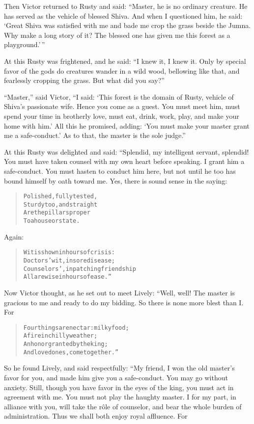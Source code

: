 \documentclass[article, twoside, 14pt]{memoir}
\renewenvironment{verbatim}{%
\begin{quote}%
\vskip -10pt%
\begin{alltt}\normalfont\large}{\end{alltt}%
\end{quote}%
\vskip -10pt
} %
\begin{document}
Then Victor returned to Rusty and said:
``Master, he is no ordinary creature. He has served as the vehicle of blessed Shiva. And when I questioned him, he said: `Great Shiva was satisfied with me and bade me crop the grass beside the Jumna. Why make a long story of it? The blessed one has given me this forest as a playground.'\,''

At this Rusty was frightened, and he said:
``I knew it, I knew it. Only by special favor of the gods do creatures wander in a wild wood, bellowing like that, and fearlessly cropping the grass. But what did you say?''

``Master,'' said Victor,
``I said: `This forest is the domain of Rusty, vehicle of Shiva's passionate wife. Hence you come as a guest. You must meet him, must spend your time in brotherly love, must eat, drink, work, play, and make your home with him.' All this he promised, adding: `You must make your master grant me a safe-conduct.' As to that, the master is the sole judge.''

At this Rusty was delighted and said: “Splendid, my intelligent
servant, splendid! You must have taken counsel with my own heart
before speaking. I grant him a safe-conduct. You must hasten to
conduct him here, but not until he too has bound himself by oath
toward me. Yes, there is sound sense in the saying:

\begin{verbatim}
Polished, fully tested,
    Sturdy too, and straight
Are the pillars proper
    To a house{\textemdash}or state.
\end{verbatim}
Again:

\begin{verbatim}
Wit is shown in hours of crisis:
    Doctors' wit, in sore disease;
Counselors', in patching friendship{\textemdash}
    All are wise in hours of ease.”
\end{verbatim}
Now Victor thought, as he set out to meet Lively: “Well, well! The
master is gracious to me and ready to do my bidding. So there is
none more blest than I. For

\begin{verbatim}
Four things are nectar: milky food;
    A fire in chilly weather;
An honor granted by the king;
    And loved ones, come together.”
\end{verbatim}
So he found Lively, and said respectfully: “My friend, I won the
old master's favor for you, and made him give you a safe-conduct.
You may go without anxiety. Still, though you have favor in the
eyes of the king, you must act in agreement with me. You must not
play the haughty master. I for my part, in alliance with you, will
take the rôle of counselor, and bear the whole burden of
administration. Thus we shall both enjoy royal affluence. For
\end{document}
